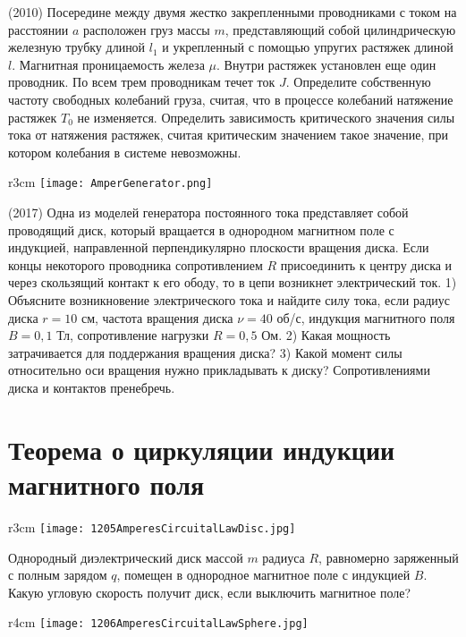 \AddProb (2010) Посередине между двумя жестко закрепленными проводниками с током на расстоянии $a$ расположен груз массы $m$, 
представляющий собой цилиндрическую железную трубку длиной $l_1$ и укрепленный с помощью упругих растяжек длиной $l$. 
Магнитная проницаемость железа $\mu$. Внутри растяжек установлен еще один проводник. По всем трем проводникам течет ток $J$. 
Определите собственную частоту свободных колебаний груза, считая, что в процессе колебаний натяжение растяжек $T_0$ не изменяется. 
Определить зависимость критического значения силы тока от натяжения растяжек, считая критическим значением такое значение, 
при котором колебания в системе невозможны.

\begin{wrapfigure}{r}{3cm}
\texttt{[image: AmperGenerator.png]}
\end{wrapfigure}
\AddProb (2017) Одна из моделей генератора постоянного тока представляет собой проводящий диск, который вращается в однородном магнитном поле с индукцией,
направленной перпендикулярно плоскости вращения диска. Если концы некоторого проводника сопротивлением $R$ присоединить к центру диска и через скользящий контакт к его ободу, то в цепи возникнет электрический ток. 1) Объясните
возникновение электрического тока и найдите силу тока, если радиус диска $r = 10$ см, частота вращения диска $\nu = 40$ об/с, индукция магнитного поля $B = 0,1$ Тл, сопротивление нагрузки $R = 0,5$ Ом. 2) Какая мощность затрачивается для поддержания вращения диска? 3) Какой момент силы относительно оси вращения нужно прикладывать к диску? Сопротивлениями диска и контактов пренебречь.


\section{Теорема о циркуляции индукции магнитного поля}

\begin{wrapfigure}{r}{3cm}
\texttt{[image: 1205AmperesCircuitalLawDisc.jpg]}
\end{wrapfigure}

\AddProb Однородный диэлектрический диск массой $m$ радиуса $R$, равномерно заряженный с полным зарядом $q$, 
помещен в однородное магнитное поле с индукцией $B$. Какую угловую скорость получит диск, если выключить магнитное поле?

\begin{wrapfigure}{r}{4cm}
\texttt{[image: 1206AmperesCircuitalLawSphere.jpg]}
\end{wrapfigure}

